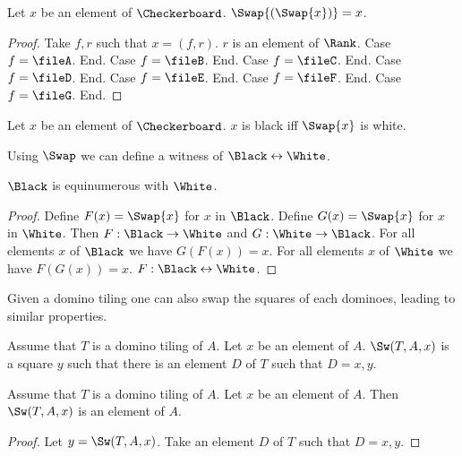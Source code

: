 \begin{forthel}
    \begin{lemma}
        Let $x$ be an element of $\Checkerboard$.
        $\Swap{(\Swap{x})} = x$.
    \end{lemma}
    \begin{proof}
        Take $f, r$ such that $x = (f,r)$. $r$ is an element of $\Rank$.
        Case $f = \fileA$. End.
        Case $f = \fileB$. End.
        Case $f = \fileC$. End.
        Case $f = \fileD$. End.
        Case $f = \fileE$. End.
        Case $f = \fileF$. End.
        Case $f = \fileG$. End.
    \end{proof}

    \begin{lemma}
        Let $x$ be an element of $\Checkerboard$.
        $x$ is black iff $\Swap{x}$ is white.
    \end{lemma}
\end{forthel}

Using $\Swap$ we can define a witness of $\Black \leftrightarrow \White$.

\begin{forthel}
    \begin{lemma}
        $\Black$ is equinumerous with $\White$.
    \end{lemma}
    \begin{proof}
        Define $F(x) = \Swap{x}$ for $x$ in $\Black$.
        Define $G(x) = \Swap{x}$ for $x$ in $\White$.
        Then $F : \Black \to \White$ and $G : \White \to \Black$.
        For all elements $x$ of $\Black$ we have $G(F(x)) = x$.
        For all elements $x$ of $\White$ we have $F(G(x)) = x$.
        $F : \Black \leftrightarrow \White$.
    \end{proof}
\end{forthel}

Given a domino tiling one can also swap the squares of each dominoes,
leading to similar properties.

\begin{forthel}
    \begin{signature}
        Assume that $T$ is a domino tiling of $A$.
        Let $x$ be an element of $A$.
        $\Sw(T,A,x)$ is a square $y$ such that there is an element $D$ of $T$
        such that $D = {x,y}$.
    \end{signature}

    \begin{lemma}
        Assume that $T$ is a domino tiling of $A$.
        Let $x$ be an element of $A$.
        Then $\Sw(T,A,x)$ is an element of $A$.
    \end{lemma}
    \begin{proof}
        Let $y = \Sw(T,A,x)$.
        Take an element $D$ of $T$ such that $D = {x,y}$.
    \end{proof}
\end{forthel}


